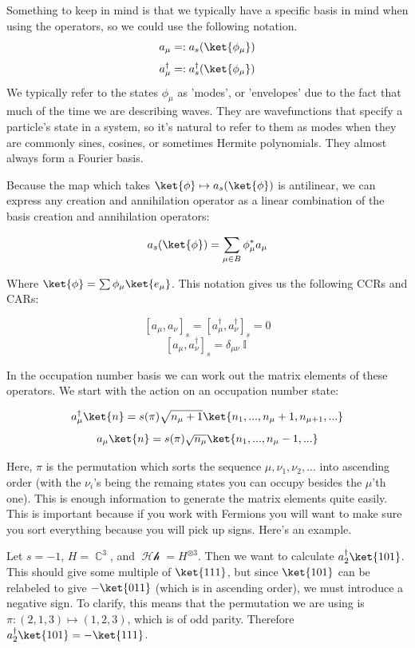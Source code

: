 \documentclass{article}
\DeclareMathOperator{\Hh}{\mathcal{Hh}}
\DeclareMathOperator{\II}{\mathbb{I}}
\DeclareMathOperator{\CC}{\mathbb{C}}
\begin{document}
Something to keep in mind is that we typically have a specific basis in mind when using the operators, so we could use the following notation.
\begin{equation}
a_\mu =: a_s(\ket{\phi_\mu})
\end{equation}
\begin{equation}
a_\mu^\dagger =: a_s^\dagger(\ket{\phi_\mu})
\end{equation}
We typically refer to the states $\phi_\mu$ as 'modes', or 'envelopes' due to the fact that much of the time we are describing waves. They are wavefunctions that specify a particle's state in a system, so it's natural to refer to them as modes when they are commonly sines, cosines, or sometimes Hermite polynomials. They almost always form a Fourier basis. 

Because the map which takes $\ket{\phi} \mapsto a_s(\ket{\phi})$ is antilinear, we can express any creation and annihilation operator as a linear combination of the basis creation and annihilation operators:

\begin{equation}
a_s(\ket{\phi}) = \sum_{\mu \in B}\phi_\mu^*a_\mu
\end{equation}

Where $\ket{\phi} = \sum \phi_\mu \ket{e_\mu}$. This notation gives us the following CCRs and CARs:

\[ [a_\mu,a_\nu]_s=[a_\mu^\dagger,a_\nu^\dagger]_s=0 \]
\[ [a_\mu,a_\nu^\dagger]_s=\delta_{\mu\nu}\II \]

In the occupation number basis we can work out the matrix elements of these operators. We start with the action on an occupation number state:

\[a_\mu^\dagger \ket{n} = s(\pi) \sqrt{n_\mu+1}\ket{n_1,...,n_\mu+1,n_{\mu+1},...}\]
\[a_\mu \ket{n} = s(\pi)\sqrt{n_\mu}\ket{n_1,...,n_\mu-1,...}\]

Here, $\pi$ is the permutation which sorts the sequence $\mu,\nu_1,\nu_2,...$ into ascending order (with the $\nu_i$'s being the remaing states you can occupy besides the $\mu$'th one). This is enough information to generate the matrix elements quite easily. This is important because if you work with Fermions you will want to make sure you sort everything because you will pick up signs. Here's an example.

Let $s = -1$, $H=\CC^3$, and $\Hh = H^{\otimes 3}$. Then we want to calculate $a_2^\dagger \ket{101}$. This should give some multiple of $\ket{111}$, but since $\ket{101}$ can be relabeled to give $-\ket{011}$  (which is in ascending order), we must introduce a negative sign. To clarify, this means that the permutation we are using is $\pi : (2,1,3)\mapsto (1,2,3)$, which is of odd parity. Therefore $a_2^\dagger \ket{101}=-\ket{111}$.
\end{document}
